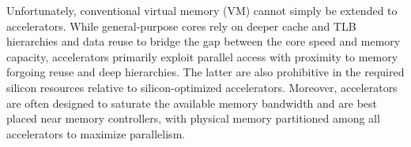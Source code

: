 
Unfortunately, conventional virtual memory (VM) cannot simply be extended to accelerators. While general-purpose cores rely on deeper cache and TLB hierarchies and data reuse to bridge the gap between the core speed and memory capacity, accelerators primarily exploit parallel access with proximity to memory\cite{} forgoing reuse and deep hierarchies. The latter are also prohibitive in the required silicon resources relative to silicon-optimized accelerators. Moreover, accelerators are often designed to saturate the available memory bandwidth and are best placed near memory controllers, with physical memory partitioned among all accelerators to maximize parallelism\cite{}.



